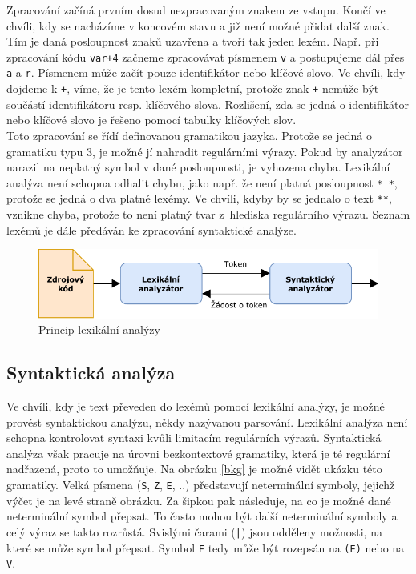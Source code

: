 			Zpracování začíná prvním dosud nezpracovaným znakem ze vstupu. Končí ve chvíli, kdy se nacházíme v koncovém stavu a již není možné přidat další znak. Tím je daná posloupnost znaků uzavřena a tvoří tak jeden lexém. Např. při zpracování kódu \texttt{var+4} začneme zpracovávat písmenem \texttt{v} a postupujeme dál přes \texttt{a} a \texttt{r}. Písmenem může začít pouze identifikátor nebo klíčové slovo. Ve chvíli, kdy dojdeme k \texttt{+}, víme, že je tento lexém kompletní, protože znak \texttt{+} nemůže být součástí identifikátoru resp. klíčového slova. Rozlišení, zda se jedná o identifikátor nebo klíčové slovo je řešeno pomocí tabulky klíčových slov.\\
			
			Toto zpracování se řídí definovanou gramatikou jazyka. Protože se jedná o gramatiku typu 3, je možné jí nahradit regulárními výrazy. Pokud by analyzátor narazil na neplatný symbol v dané posloupnosti, je vyhozena chyba. Lexikální analýza není schopna odhalit chybu, jako např. že není platná posloupnost \texttt{* *}, protože se jedná o dva platné lexémy. Ve chvíli, kdyby by se jednalo o text \texttt{**}, vznikne chyba, protože to není platný tvar z~hlediska regulárního výrazu. Seznam lexémů je dále předáván ke zpracování syntaktické analýze.
			
				\begin{figure}[!htb]
						\centering
						\includegraphics[width=1\textwidth]{img/lexicalAnalysis.pdf}
						\caption[lexicalAnalysis]{Princip lexikální analýzy}
						\label{lexicalAnalysis}
					\endminipage\hfill
				\end{figure}			
			
		\subsection{Syntaktická analýza}
			Ve chvíli, kdy je text převeden do lexémů pomocí lexikální analýzy, je možné provést syntaktickou analýzu, někdy nazývanou parsování. Lexikální analýza není schopna kontrolovat syntaxi kvůli limitacím regulárních výrazů. Syntaktická analýza však pracuje na úrovni bezkontextové gramatiky, která je té regulární nadřazená, proto to umožňuje. Na obrázku \ref{bkg} je možné vidět ukázku této gramatiky. Velká písmena (\texttt{S}, \texttt{Z}, \texttt{E}, ..) představují neterminální symboly, jejichž výčet je na levé straně obrázku. Za šipkou pak následuje, na co je možné dané neterminální symbol přepsat. To často mohou být další neterminální symboly a celý výraz se takto rozrůstá. Svislými čarami (\texttt{|}) jsou odděleny možnosti, na které se může symbol přepsat. Symbol \texttt{F} tedy může být rozepsán na \texttt{(E)} nebo na \texttt{V}.\\
			
